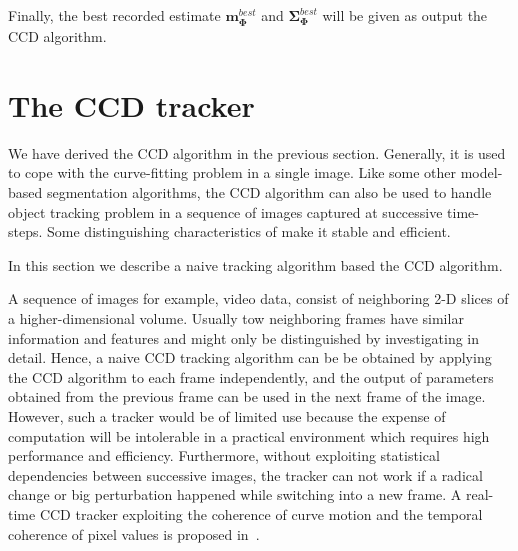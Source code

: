 Finally, the best recorded estimate
$\mathbf{m}_{\mathbf{\Phi}}^{best}$ and
$\mathbf{\Sigma}_{\mathbf{\Phi}}^{best}$ will be given as output the
CCD algorithm.


\section{The CCD tracker}
\label{sec:vg}

We have derived the CCD algorithm in the previous section. Generally,
it is used to cope with the curve-fitting problem in a single
image. Like some other model-based segmentation algorithms, the CCD
algorithm can also be used to handle object tracking problem in a
sequence of images captured at successive time-steps. Some
distinguishing characteristics of make it stable and efficient.

In this section we describe a naive tracking algorithm based the CCD
algorithm.

A sequence of images for example, video data, consist of neighboring 2-D slices of a
higher-dimensional volume. Usually tow neighboring frames have similar
information and features and might only be distinguished by
investigating in detail. Hence, a naive CCD tracking algorithm can be
 be obtained by applying the CCD algorithm to each frame
 independently, and the output of parameters obtained from  the
 previous frame can be used in the next frame of the image. However, such
 a tracker would be of limited use because the expense of computation
 will be intolerable in a practical environment which requires high
 performance and efficiency. Furthermore, without exploiting
 statistical dependencies between successive images, the tracker can
 not work if a radical change or big perturbation happened while
 switching into a new frame. A real-time CCD tracker exploiting the
 coherence of curve motion and the temporal coherence of pixel values
 is proposed in~\cite{hanek2004fitting}. 


